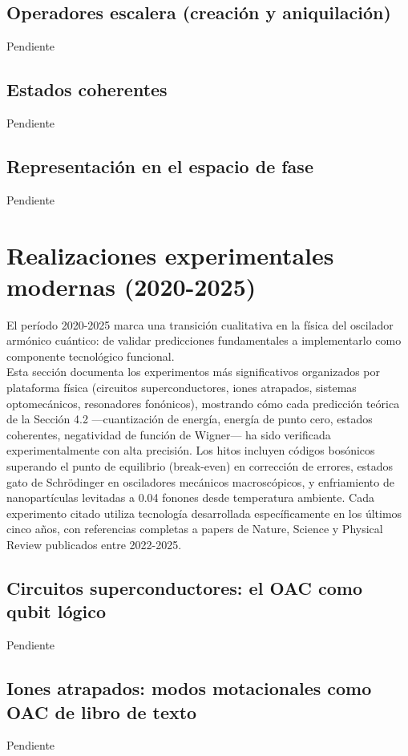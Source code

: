 \documentclass[11pt,a4paper,spanish]{book}
\begin{document}
\subsection*{Operadores escalera (creación y aniquilación)}
Pendiente

\subsection*{Estados coherentes}
Pendiente

\subsection*{Representación en el espacio de fase}
Pendiente


\section{Realizaciones experimentales modernas (2020-2025)}
El período 2020-2025 marca una transición cualitativa en la física del oscilador armónico cuántico: de validar predicciones fundamentales a implementarlo como componente tecnológico funcional.\\

Esta sección documenta los experimentos más significativos organizados por plataforma física (circuitos superconductores, iones atrapados, sistemas optomecánicos, resonadores fonónicos), mostrando cómo cada predicción teórica de la Sección 4.2 —cuantización de energía, energía de punto cero, estados coherentes, negatividad de función de Wigner— ha sido verificada experimentalmente con alta precisión. 
Los hitos incluyen códigos bosónicos superando el punto de equilibrio (break-even) en corrección de errores, estados gato de Schrödinger en osciladores mecánicos macroscópicos, y enfriamiento de nanopartículas levitadas a 0.04 fonones desde temperatura ambiente. Cada experimento citado utiliza tecnología desarrollada específicamente en los últimos cinco años, con referencias completas a papers de Nature, Science y Physical Review publicados entre 2022-2025.

\subsection*{Circuitos superconductores: el OAC como qubit lógico}
Pendiente


\subsection*{Iones atrapados: modos motacionales como OAC de libro de texto}
Pendiente
\end{document}
